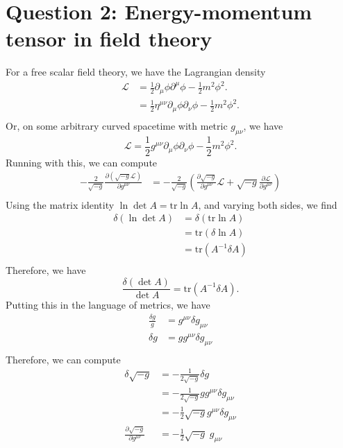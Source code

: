 \documentclass[12pt]{article}
\newcommand{\delmu}{\partial_{\mu}}
\newcommand{\delMu}{\partial^{\mu}}
\newcommand{\delnu}{\partial_{\nu}}
\begin{document}
\section*{Question 2: Energy-momentum tensor in field theory}
For a free scalar field theory, we have the Lagrangian density
\begin{align*}
    \mathcal{L} &= \frac{1}{2}\delmu\phi\delMu\phi - \frac{1}{2}m^2\phi^2.\\
    &= \frac{1}{2}\eta^{\mu\nu}\delmu\phi\delnu\phi - \frac{1}{2}m^2\phi^2.\\
\end{align*}
Or, on some arbitrary curved spacetime with metric $g_{\mu\nu}$, we have
\begin{equation*}
    \mathcal{L} = \frac{1}{2}g^{\mu\nu}\delmu\phi\delnu\phi - \frac{1}{2}m^2\phi^2.
\end{equation*}
Running with this, we can compute
\begin{align*}
    -\frac{2}{\sqrt{-g}}\frac{\partial(\sqrt{-g}\mathcal{L})}{\partial g^{\mu\nu}}
    &= -\frac{2}{\sqrt{-g}} \left( \frac{\partial\sqrt{-g}}{\partial g^{\mu\nu}}\mathcal{L} + \sqrt{-g}\frac{\partial\mathcal{L}}{\partial g^{\mu\nu}} \right)\\
\end{align*}
Using the matrix identity $\ln \det A = \text{tr} \ln A$, and varying both sides, we find
\begin{align*}
    \delta(\ln \det A) &= \delta(\text{tr} \ln A) \\
    &= \text{tr}(\delta \ln A) \\
    &= \text{tr} (A^{-1}\delta A) \\
\end{align*}
Therefore, we have
\begin{equation*}
    \frac{\delta(\det A)}{\det A} = \text{tr}(A^{-1}\delta A).
\end{equation*}
Putting this in the language of metrics, we have
\begin{align*}
    \frac{\delta g}{g} &= g^{\mu\nu}\delta g_{\mu\nu} \\
    \delta g &= g g^{\mu\nu}\delta g_{\mu\nu} \\
\end{align*}
Therefore, we can compute
\begin{align*}
    \delta \sqrt{-g} &= -\frac{1}{2\sqrt{-g}}\delta g \\
    &= -\frac{1}{2\sqrt{-g}} g g^{\mu\nu}\delta g_{\mu\nu} \\
    &= -\frac{1}{2}\sqrt{-g} g^{\mu\nu}\delta g_{\mu\nu} \\
    \frac{\partial \sqrt{-g}}{\partial g^{\mu\nu}} &= -\frac{1}{2}\sqrt{-g} \; g_{\mu\nu} \\
\end{align*}
\end{document}
